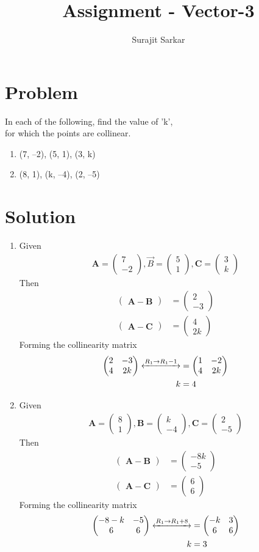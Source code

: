 \documentclass[journal,12pt,twocolumn]{IEEEtran}
\title{\mytitle}
\title{
Assignment - Vector-3
}
\author{Surajit Sarkar}
\newcommand{\myvec}[1]{\ensuremath{\begin{pmatrix}#1\end{pmatrix}}}
\let\vec\mathbf
\begin{document}
\maketitle
\tableofcontents
\bigskip
\section{\textbf{Problem}}
In each of the following, find the value of ’k’,\\ for which the points are collinear.
\begin{enumerate}[label=(\roman*)]
\item (7, –2), (5, 1), (3, k)
\item(8, 1), (k, –4), (2, –5)
\end{enumerate}
\section{\textbf{Solution}}
\begin{enumerate}[label=(\roman*)]
    \item Given
    \begin{align}
      \vec{A}=\myvec{7\\-2},\Vec{B}=\myvec{5\\1},\vec{C}=\myvec{3\\k}  
    \end{align}
    Then
    \begin{align}
        \myvec{\vec{A}-\vec{B}}&=\myvec{2\\-3}\\
        \myvec{\vec{A}-\vec{C}}&=\myvec{4\\2k}\
    \end{align}
    Forming the collinearity matrix
    \begin{align}
        \myvec{2&-3\\4&2k} \xleftrightarrow{R_1\rightarrow{R_1-1}}&=\myvec{1&-2\\4&2k}\\
        k&=4
        \end{align}
    
    \item Given
     \begin{align}
      \vec{A}=\myvec{8\\1},\vec{B}=\myvec{k\\-4},\vec{C}=\myvec{2\\-5}  
    \end{align}
    Then
    \begin{align}
        \myvec{\vec{A}-\vec{B}}&=\myvec{-8k\\-5}\\
        \myvec{\vec{A}-\vec{C}}&=\myvec{6\\6}\
    \end{align}
    Forming the collinearity matrix
    \begin{align}
        \myvec{-8-k&-5\\6&6} \xleftrightarrow{R_1\rightarrow{R_1+8}}&=\myvec{-k&3\\6&6}\\
        k&=3
        \end{align}
\end{enumerate}
\end{document}
